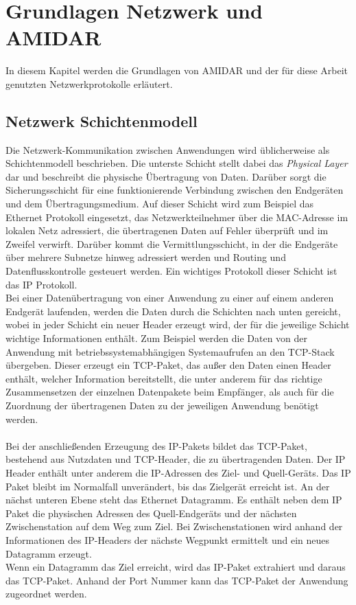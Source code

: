 \chapter{Grundlagen Netzwerk und AMIDAR}
In diesem Kapitel werden die Grundlagen von AMIDAR und der für diese Arbeit genutzten Netzwerkprotokolle erläutert. 

\section{Netzwerk Schichtenmodell}
Die Netzwerk-Kommunikation zwischen Anwendungen wird üblicherweise als Schichtenmodell beschrieben.  
Die unterste Schicht stellt dabei das \textit{Physical Layer} dar und beschreibt die physische Übertragung von Daten. 
Darüber sorgt die Sicherungsschicht für eine funktionierende Verbindung zwischen den Endgeräten und dem Übertragungsmedium. Auf dieser Schicht wird zum Beispiel das Ethernet Protokoll eingesetzt, das Netzwerkteilnehmer über die MAC-Adresse im lokalen Netz adressiert, die übertragenen Daten auf Fehler überprüft und im Zweifel verwirft. 
Darüber kommt die Vermittlungsschicht, in der die Endgeräte über mehrere Subnetze hinweg adressiert werden und Routing und Datenflusskontrolle gesteuert werden. Ein wichtiges Protokoll dieser Schicht ist das IP Protokoll. \\
Bei einer Datenübertragung von einer Anwendung zu einer auf einem anderen Endgerät laufenden, werden die Daten durch die Schichten nach unten gereicht, wobei in jeder Schicht ein neuer Header erzeugt wird, der für die jeweilige Schicht wichtige Informationen enthält. Zum Beispiel werden die Daten von der Anwendung mit betriebssystemabhängigen Systemaufrufen an den TCP-Stack übergeben. Dieser erzeugt ein TCP-Paket, das außer den Daten einen Header enthält, welcher Information bereitstellt, die unter anderem für das richtige Zusammensetzen der einzelnen Datenpakete beim Empfänger, als auch für die Zuordnung der übertragenen Daten zu der jeweiligen Anwendung benötigt werden.\\\\
Bei der anschließenden Erzeugung des IP-Pakets bildet das TCP-Paket, bestehend aus Nutzdaten und TCP-Header, die zu übertragenden Daten. Der IP Header enthält unter anderem die IP-Adressen des Ziel- und Quell-Geräts. Das IP Paket bleibt im Normalfall unverändert, bis das Zielgerät erreicht ist. An der nächst unteren Ebene steht das Ethernet Datagramm. Es enthält neben dem IP Paket die physischen Adressen des Quell-Endgeräts und der nächsten Zwischenstation auf dem Weg zum Ziel. Bei Zwischenstationen wird anhand der Informationen des IP-Headers der nächste Wegpunkt ermittelt und ein neues Datagramm erzeugt. \\
Wenn ein Datagramm das Ziel erreicht, wird das IP-Paket extrahiert und daraus das TCP-Paket. Anhand der Port Nummer kann das TCP-Paket der Anwendung zugeordnet werden.



